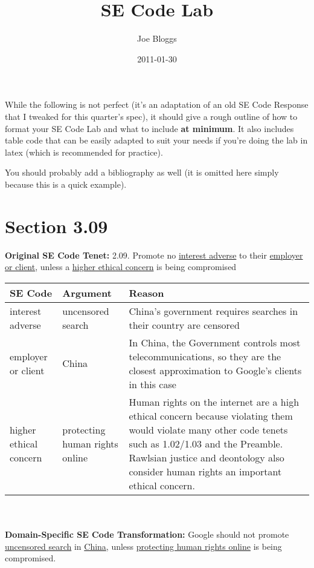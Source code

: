 \documentclass[]{article}
\title{SE Code Lab}
\author{Joe Bloggs}
\date{2011-01-30}
\begin{document}
\ifpdf
{}
\else
{}
\fi

\maketitle




While the following is not perfect (it's an adaptation of an old SE Code Response that I tweaked for this quarter's spec), it should give a rough outline of how to format your SE Code Lab and what to include \textbf{at minimum}. It also includes table code that can be easily adapted to suit your needs if you're doing the lab in latex (which is recommended for practice).

You should probably add a bibliography as well (it is omitted here simply because this is a quick example).

\section{Section 3.09}

\textbf{Original SE Code Tenet:}
2.09. Promote no \underline{interest adverse} to their \underline{employer or client}, unless a \underline{higher ethical concern} is
being compromised
\newline

\begin{tabular}{|p{100pt}|p{100pt}|p{220pt}|}
\hline
SE Code & Argument & Reason\\
\hline
interest adverse & uncensored search & China's government requires searches in their country are censored\\
\hline
employer or client & China & In China, the Government controls most telecommunications, so they are the closest approximation to Google's clients in this case\\
\hline
higher ethical concern & protecting human rights online & Human rights on the internet are a high ethical concern because violating them would violate many other code tenets such as 1.02/1.03 and the Preamble. Rawlsian justice and deontology also consider human rights an important ethical concern.\\
\hline
\end{tabular}\\
\newline\\
\textbf{Domain-Specific SE Code Transformation:}
Google should not promote \underline{uncensored search} in \underline{China}, unless \underline{protecting human rights online} is
being compromised.
\end{document}
